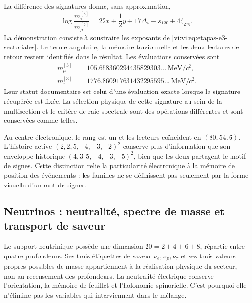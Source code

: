 La différence des signatures donne, sans approximation,
\begin{equation}
 \log\frac{m_\tau^{[3]}}{m_\mu^{[3]}}
 =22x+\frac12y+17\Delta_4-s_{120}+4\zeta_{270}.
 \label{vi:vi:eq:razon-tau-muon}
\end{equation}
La démonstration consiste à soustraire les exposants de
\eqref{vi:vi:eq:etapas-e3-sectoriales}. Le terme angulaire, la mémoire
torsionnelle et les deux lectures de retour restent identifiés dans le
résultat. Les évaluations conservées sont
\begin{align*}
 m_\mu^{[3]}&=105.658360294435829303\ldots\ \mathrm{MeV}/c^2,\\
 m_\tau^{[3]}&=1776.860917631432295595\ldots\ \mathrm{MeV}/c^2.
\end{align*}
Leur statut documentaire est celui d’une évaluation exacte lorsque la signature récupérée est fixée.
La sélection physique de cette signature au sein de la multisection et le critère
de raie spectrale sont des opérations différentes et sont conservées comme telles.

Au centre électronique, le rang est un et les lecteurs coïncident en
\((80,54,6)\). L'histoire active
\((2,2,5,-4,-3,-2)^2\) conserve plus d'information que son enveloppe
historique \((4,3,5,-4,-3,-5)^2\), bien que les deux partagent le motif de
signes. Cette distinction relie la particularité électronique à la
mémoire de position des événements : les familles ne se définissent pas seulement par
la forme visuelle d'un mot de signes.

\subsection{Neutrinos : neutralité, spectre de masse et transport de saveur}
\label{vi:vi:subsec:neutrinos-familias}

Le support neutrinique possède une dimension \(20=2+4+6+8\), répartie entre
quatre profondeurs. Ses trois étiquettes de saveur
\(\nu_e,\nu_\mu,\nu_\tau\) et ses trois valeurs propres possibles de masse
appartiennent à la réalisation physique du secteur, non au recensement des
profondeurs. La neutralité électrique conserve l’orientation, la
mémoire de feuillet et l’holonomie spinorielle. C’est pourquoi elle n’élimine pas les
variables qui interviennent dans le mélange.

